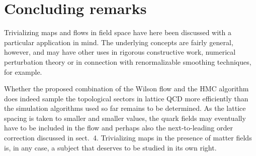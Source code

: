\section{Concluding remarks}

Trivializing maps and flows in
field space have here been discussed with a particular application
in mind.
The underlying concepts are fairly general, however, and
may have other uses in rigorous constructive work,
numerical perturbation theory or in connection with
renormalizable smoothing techniques, for example.

Whether the proposed combination of the Wilson flow
and the HMC algorithm does indeed
sample the topological sectors in lattice QCD more efficiently
than the simulation algorithms used so far remains to be determined.
As the lattice spacing is taken to smaller and smaller values,
the quark fields
may eventually have to be included in the flow and perhaps also
the next-to-leading order correction
discussed in sect.~4. Trivializing maps
in the presence of matter fields is, in any case,
a subject that deserves to be
studied in its own right.
